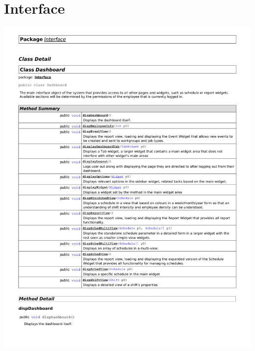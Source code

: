 \documentclass[letterpaper,12pt]{report}
\begin{document}
\section{Interface}
\includegraphics[scale=0.9,trim=20mm 20mm 25mm 15mm]{externals/di1.pdf}
\newpage
\end{document}
